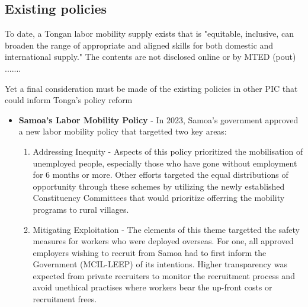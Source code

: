 \documentclass[9pt,a4paper,twocolumn,twoside]{tau-class/tau}
\begin{document}
\subsection{Existing policies}

To date, a Tongan labor mobility supply exists that is "equitable, inclusive, can broaden the range of appropriate and aligned skills for both domestic and international supply." The contents are not disclosed online or by MTED (pout) .......

\noindent Yet a final consideration must be made of the existing policies in other PIC that could inform Tonga's policy reform 

\begin{itemize}
\item \textbf{Samoa's Labor Mobility Policy} - In 2023, Samoa's government approved a new labor mobility policy that targetted two key areas: 
\begin{enumerate}
    \item Addressing Inequity - Aspects of this policy prioritized the mobilisation of unemployed people, especially those who have gone without employment for 6 months or more. Other efforts targeted the equal distributions of opportunity through these schemes by utilizing the newly established Constituency Committees that would prioritize offerring the mobility programs to rural villages.
    \item Mitigating Exploitation - The elements of this theme targetted the safety measures for workers who were deployed overseas. For one, all approved employers wishing to recruit from Samoa had to first inform the Government (MCIL-LEEP) of its intentions. Higher transparency was expected from private recruiters to monitor the recruitment process and avoid unethical practises where workers bear the up-front costs or recruitment frees.
\end{enumerate}



\end{itemize}
\end{document}
